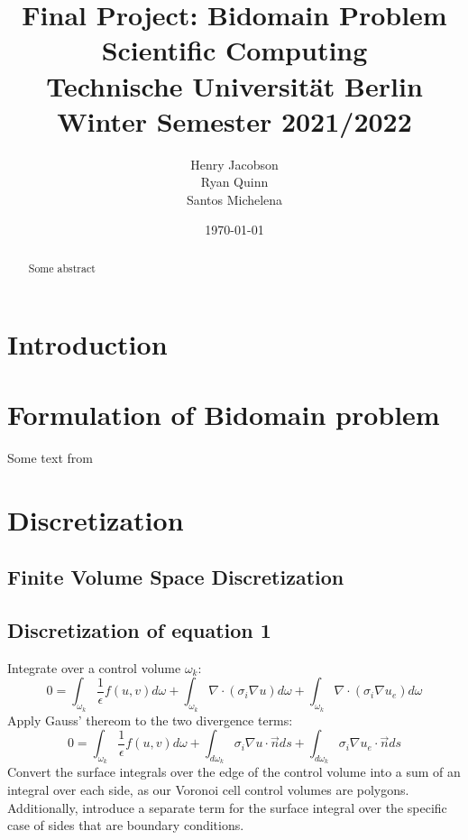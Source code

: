 \documentclass{finalproject}
\title{Final Project: Bidomain Problem \\ \large{Scientific Computing \\ Technische Universität Berlin \\ Winter Semester 2021/2022}}
\author{Henry Jacobson\\Ryan Quinn\\Santos Michelena}
\date{\today}
\begin{document}
\maketitle

\begin{abstract} %
Some abstract
\end{abstract}

\section{Introduction} %
\section{Formulation of Bidomain problem}
Some text from \cite{eth_bou}
\section{Discretization}
\subsection{Finite Volume Space Discretization}
\subsection{Discretization of equation 1}
Integrate over a control volume $\omega_k$:
\begin{equation}
   0=\int_{\omega_k}\frac{1}{\epsilon}f(u,v)d\omega +
       \int_{\omega_k}\nabla \cdot (\sigma_i \nabla u)d\omega + \int_{\omega_k}\nabla \cdot (\sigma_i \nabla u_e)d\omega
\end{equation}
Apply Gauss' thereom to the two divergence terms:
\begin{equation}
    0=\int_{\omega_k}\frac{1}{\epsilon}f(u,v)d\omega +
    \int_{d\omega_k}\sigma_i \nabla u \cdot \overrightarrow{n}ds +
    \int_{d\omega_k}\sigma_i \nabla u_e \cdot \overrightarrow{n}ds
\end{equation}
Convert the surface integrals over the edge of the control volume into a sum of an integral over each side, as our Voronoi cell control volumes are polygons. Additionally, introduce a separate term for the surface integral over the specific case of sides that are boundary conditions.
\end{document}
